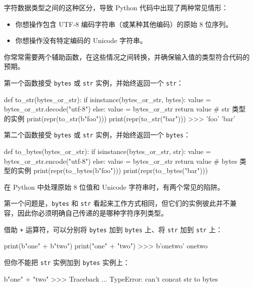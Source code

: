 字符数据类型之间的这种区分，导致 Python 代码中出现了两种常见情形：

\begin{itemize}
\item 你想操作包含 UTF-8 编码字符串（或某种其他编码）的原始 8 位序列。
\item 你想操作没有特定编码的 Unicode 字符串。
\end{itemize}

你常常需要两个辅助函数，在这些情况之间转换，并确保输入值的类型符合代码的预期。

第一个函数接受 \texttt{bytes} 或 \texttt{str} 实例，并始终返回一个 \texttt{str}：

\begin{codebox}[python]
def to_str(bytes_or_str):
    if isinstance(bytes_or_str, bytes):
        value = bytes_or_str.decode("utf-8")
    else:
        value = bytes_or_str
    return value  # str 类型的实例
print(repr(to_str(b"foo")))
print(repr(to_str("bar")))
>>>
'foo'
'bar'
\end{codebox}

第二个函数接受 \texttt{bytes} 或 \texttt{str} 实例，并始终返回一个 \texttt{bytes}：

\begin{codebox}[python]
def to_bytes(bytes_or_str):
    if isinstance(bytes_or_str, str):
        value = bytes_or_str.encode("utf-8")
    else:
        value = bytes_or_str
    return value  # bytes 类型的实例
print(repr(to_bytes(b"foo")))
print(repr(to_bytes("bar")))
\end{codebox}

在 Python 中处理原始 8 位值和 Unicode 字符串时，有两个常见的陷阱。

第一个问题是，\texttt{bytes} 和 \texttt{str} 看起来工作方式相同，但它们的实例彼此并不兼容，因此你必须明确自己传递的是哪种字符序列类型。

借助 \texttt{+} 运算符，可以分别将 \texttt{bytes} 加到 \texttt{bytes} 上、将 \texttt{str} 加到 \texttt{str} 上：

\begin{codebox}[python]
print(b"one" + b"two")
print("one" + "two")
>>>
b'onetwo'
onetwo
\end{codebox}

但你不能把 \texttt{str} 实例加到 \texttt{bytes} 实例上：

\begin{codebox}[python]
b"one" + "two"
>>>
Traceback ...
TypeError: can't concat str to bytes
\end{codebox}


